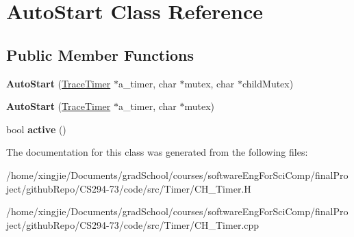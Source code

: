 \hypertarget{classAutoStart}{}\section{Auto\+Start Class Reference}
\label{classAutoStart}
\subsection*{Public Member Functions}
\begin{DoxyCompactItemize}
\item 
\hypertarget{classAutoStart_a9e0816a258371fe0ec3ea3c14267ef5c}{}{\bfseries Auto\+Start} (\hyperlink{classTraceTimer}{Trace\+Timer} $\ast$a\+\_\+timer, char $\ast$mutex, char $\ast$child\+Mutex)\label{classAutoStart_a9e0816a258371fe0ec3ea3c14267ef5c}

\item 
\hypertarget{classAutoStart_aa3bd9f51f4f29c99c2147903cc6db7d2}{}{\bfseries Auto\+Start} (\hyperlink{classTraceTimer}{Trace\+Timer} $\ast$a\+\_\+timer, char $\ast$mutex)\label{classAutoStart_aa3bd9f51f4f29c99c2147903cc6db7d2}

\item 
\hypertarget{classAutoStart_a391135bddc96b9bda90d46711329fb29}{}bool {\bfseries active} ()\label{classAutoStart_a391135bddc96b9bda90d46711329fb29}

\end{DoxyCompactItemize}


The documentation for this class was generated from the following files\+:\begin{DoxyCompactItemize}
\item 
/home/xingjie/\+Documents/grad\+School/courses/software\+Eng\+For\+Sci\+Comp/final\+Project/github\+Repo/\+C\+S294-\/73/code/src/\+Timer/C\+H\+\_\+\+Timer.\+H\item 
/home/xingjie/\+Documents/grad\+School/courses/software\+Eng\+For\+Sci\+Comp/final\+Project/github\+Repo/\+C\+S294-\/73/code/src/\+Timer/C\+H\+\_\+\+Timer.\+cpp\end{DoxyCompactItemize}
